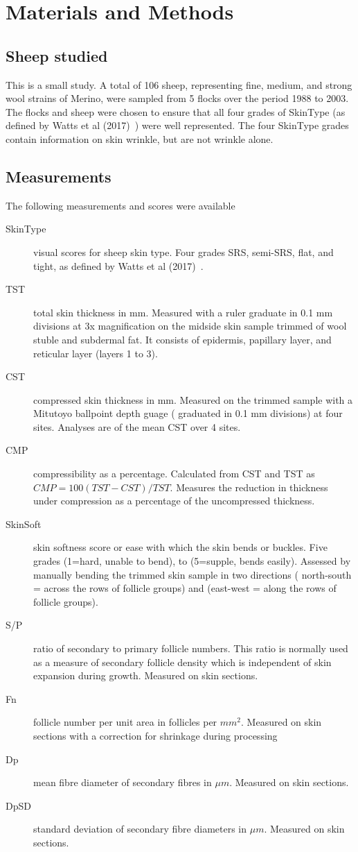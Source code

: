 \documentclass[titlepage]{article}  %
\begin{document}
\section{Materials and Methods}
\subsection{Sheep studied}
This is a small study. A total of 106 sheep, representing fine, medium, and strong wool strains of Merino, were sampled from 5 flocks over the period 1988 to 2003. The flocks and sheep were chosen to ensure that all four grades of  SkinType (as defined by Watts et al (2017)~\cite{watt:17}) were well represented. The four SkinType grades contain information on skin wrinkle, but are not wrinkle alone.

\subsection{Measurements}
The following measurements and scores were available
\begin{description}
\item[SkinType] visual scores for sheep skin type. Four grades SRS, semi-SRS, flat, and tight, as defined by Watts et al (2017)~\cite{watt:17}.
\item[TST] total skin thickness in mm. Measured with a ruler graduate in 0.1 mm divisions at 3x magnification on the midside skin sample trimmed of wool stuble and subdermal fat. It consists of epidermis, papillary layer, and reticular layer (layers 1 to 3).
\item[CST] compressed skin thickness in mm. Measured on the trimmed sample with a Mitutoyo ballpoint depth guage ( graduated in 0.1 mm divisions) at four sites. Analyses are of the mean CST over 4 sites.
\item[CMP] compressibility as a percentage. Calculated from CST and TST as $CMP = 100(TST-CST)/TST$. Measures the reduction in thickness under compression as a percentage of the uncompressed thickness.
\item[SkinSoft] skin softness score or ease with which the skin bends or buckles. Five grades (1=hard, unable to bend), to (5=supple, bends easily). Assessed by manually bending the trimmed skin sample in two directions ( north-south = across the rows of follicle groups) and (east-west = along the rows of follicle groups).
\item[S/P] ratio of secondary to primary follicle numbers. This ratio is normally used as a measure of secondary follicle density which is independent of skin expansion during growth. Measured on skin sections.
\item[Fn] follicle number per unit area in follicles per $mm^{2}$. Measured on skin sections with a correction for shrinkage during processing
\item[Dp] mean fibre diameter of secondary fibres in $\mu m$. Measured on skin sections.
\item[DpSD] standard deviation of secondary fibre diameters in $\mu m$. Measured on skin sections.
\end{description}
\end{document}
